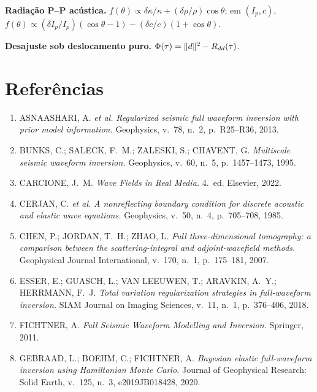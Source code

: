 \documentclass[11pt,a4paper,oneside]{report}
\begin{document}
\textbf{Radia\c{c}\~ao P--P ac\'ustica.}
$f(\theta)\propto \delta\kappa/\kappa + (\delta\rho/\rho)\cos\theta$;
em $(I_p,c)$,
$f(\theta)\propto (\delta I_p/I_p)(\cos\theta-1) - (\delta c/c)(1+\cos\theta)$.

\textbf{Desajuste sob deslocamento puro.}
$\Phi(\tau) = \lVert d \rVert^{2} - R_{dd}(\tau)$.

\chapter{Refer\^encias}

\begin{enumerate}[leftmargin=*, itemsep=3pt]
\item ASNAASHARI, A. \emph{et al.} \emph{Regularized seismic full waveform
inversion with prior model information.} Geophysics, v.~78, n.~2,
p.~R25--R36, 2013.

\item BUNKS, C.; SALECK, F.~M.; ZALESKI, S.; CHAVENT, G. \emph{Multiscale
seismic waveform inversion.} Geophysics, v.~60, n.~5, p.~1457--1473, 1995.

\item CARCIONE, J.~M. \emph{Wave Fields in Real Media.} 4.~ed. Elsevier, 2022.

\item CERJAN, C. \emph{et al.} \emph{A nonreflecting boundary condition for
discrete acoustic and elastic wave equations.} Geophysics, v.~50, n.~4,
p.~705--708, 1985.

\item CHEN, P.; JORDAN, T.~H.; ZHAO, L. \emph{Full three-dimensional
tomography: a comparison between the scattering-integral and adjoint-wavefield
methods.} Geophysical Journal International, v.~170, n.~1, p.~175--181, 2007.

\item ESSER, E.; GUASCH, L.; VAN LEEUWEN, T.; ARAVKIN, A.~Y.; HERRMANN, F.~J.
\emph{Total variation regularization strategies in full-waveform inversion.}
SIAM Journal on Imaging Sciences, v.~11, n.~1, p.~376--406, 2018.

\item FICHTNER, A. \emph{Full Seismic Waveform Modelling and Inversion.}
Springer, 2011.

\item GEBRAAD, L.; BOEHM, C.; FICHTNER, A. \emph{Bayesian elastic
full-waveform inversion using Hamiltonian Monte Carlo.} Journal of Geophysical
Research: Solid Earth, v.~125, n.~3, e2019JB018428, 2020.


\end{enumerate}
\end{document}
